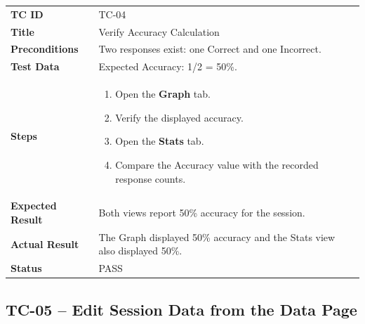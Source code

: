 \documentclass[11pt,a4paper]{article}
\begin{document}
\begin{tabularx}{\textwidth}{>{\bfseries}p{}X}
TC ID & TC-04 \\
Title & Verify Accuracy Calculation \\
Preconditions & Two responses exist: one Correct and one Incorrect. \\
Test Data & Expected Accuracy: 1/2 = 50\%. \\
Steps & \begin{enumerate}[leftmargin=*]
    \item Open the \textbf{Graph} tab.
    \item Verify the displayed accuracy.
    \item Open the \textbf{Stats} tab.
    \item Compare the Accuracy value with the recorded response counts.
\end{enumerate} \\
Expected Result & Both views report 50\% accuracy for the session. \\
Actual Result & The Graph displayed 50\% accuracy and the Stats view also displayed 50\%. \\
Status & PASS
\end{tabularx}

\subsection{TC-05 -- Edit Session Data from the Data Page}
\end{document}
